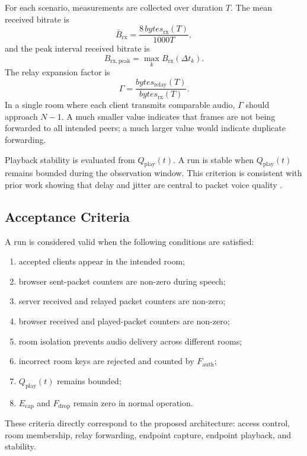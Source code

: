 \documentclass[conference]{IEEEtran}
\begin{document}
For each scenario, measurements are collected over duration $T$. The mean received bitrate is
\begin{equation}
    \bar{B}_{\mathrm{rx}} =
    \frac{8\,bytes_{\mathrm{rx}}(T)}{1000T},
    \label{eq:meanrx}
\end{equation}
and the peak interval received bitrate is
\begin{equation}
    B_{\mathrm{rx,peak}} =
    \max_k B_{\mathrm{rx}}(\Delta t_k).
    \label{eq:peakrx}
\end{equation}
The relay expansion factor is
\begin{equation}
    \Gamma =
    \frac{bytes_{\mathrm{relay}}(T)}
         {bytes_{\mathrm{rx}}(T)}.
    \label{eq:gamma}
\end{equation}
In a single room where each client transmits comparable audio, $\Gamma$ should approach $N-1$. A much smaller value indicates that frames are not being forwarded to all intended peers; a much larger value would indicate duplicate forwarding.

Playback stability is evaluated from $Q_{\mathrm{play}}(t)$. A run is stable when $Q_{\mathrm{play}}(t)$ remains bounded during the observation window. This criterion is consistent with prior work showing that delay and jitter are central to packet voice quality \cite{ieee_voip_delay_jitter,ieee_jitter_buffer_pd}.

\subsection{Acceptance Criteria}

A run is considered valid when the following conditions are satisfied:
\begin{enumerate}
    \item accepted clients appear in the intended room;
    \item browser sent-packet counters are non-zero during speech;
    \item server received and relayed packet counters are non-zero;
    \item browser received and played-packet counters are non-zero;
    \item room isolation prevents audio delivery across different rooms;
    \item incorrect room keys are rejected and counted by $F_{\mathrm{auth}}$;
    \item $Q_{\mathrm{play}}(t)$ remains bounded;
    \item $E_{\mathrm{cap}}$ and $F_{\mathrm{drop}}$ remain zero in normal operation.
\end{enumerate}
These criteria directly correspond to the proposed architecture: access control, room membership, relay forwarding, endpoint capture, endpoint playback, and stability.
\end{document}
